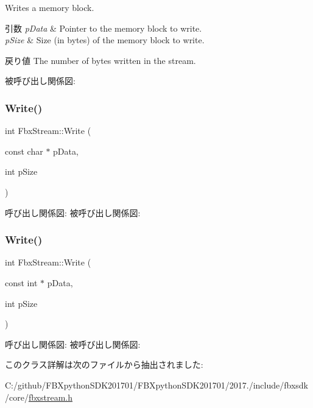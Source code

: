 Writes a memory block. 
\begin{DoxyParams}{引数}
{\em p\+Data} & Pointer to the memory block to write. \\
\hline
{\em p\+Size} & Size (in bytes) of the memory block to write. \\
\hline
\end{DoxyParams}
\begin{DoxyReturn}{戻り値}
The number of bytes written in the stream. 
\end{DoxyReturn}
被呼び出し関係図\+:
\mbox{\label{class_fbx_stream_a1506d750babeb4c981dc7aa4ce94d505}} 
\subsubsection{\texorpdfstring{Write()}{Write()}\hspace{0.1cm}{\footnotesize\ttfamily [2/3]}}
{\footnotesize\ttfamily int Fbx\+Stream\+::\+Write (\begin{DoxyParamCaption}\item[{const char $\ast$}]{p\+Data,  }\item[{int}]{p\+Size }\end{DoxyParamCaption})}

呼び出し関係図\+:
被呼び出し関係図\+:
\mbox{\label{class_fbx_stream_aef3f0bcab29775b9deffb0142a399891}} 
\subsubsection{\texorpdfstring{Write()}{Write()}\hspace{0.1cm}{\footnotesize\ttfamily [3/3]}}
{\footnotesize\ttfamily int Fbx\+Stream\+::\+Write (\begin{DoxyParamCaption}\item[{const int $\ast$}]{p\+Data,  }\item[{int}]{p\+Size }\end{DoxyParamCaption})}

呼び出し関係図\+:
被呼び出し関係図\+:


このクラス詳解は次のファイルから抽出されました\+:\begin{DoxyCompactItemize}
\item 
C\+:/github/\+F\+B\+Xpython\+S\+D\+K201701/\+F\+B\+Xpython\+S\+D\+K201701/2017./include/fbxsdk/core/\hyperlink{fbxstream_8h}{fbxstream.\+h}\end{DoxyCompactItemize}
